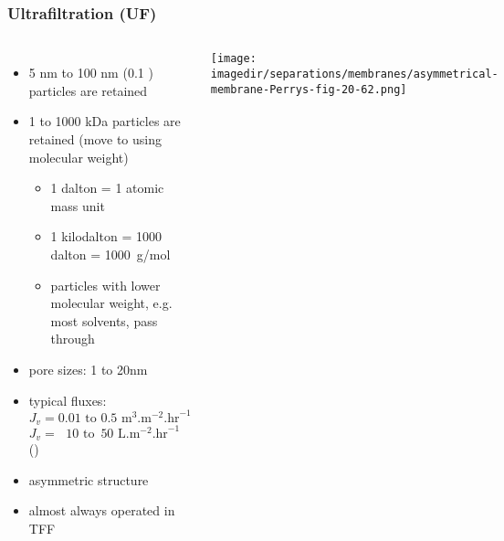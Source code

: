 \begin{frame}\frametitle{Ultrafiltration (UF)}	
	\begin{columns}[c]
			\vspace{-20pt}
			\begin{itemize}
				\item	5 nm to 100 nm (0.1 \micron) particles are retained
				\item	1 to 1000 kDa particles are retained (move to using molecular weight)
				\begin{itemize}
					\item	1 dalton = 1 atomic mass unit
					\item	1 kilodalton = 1000 dalton = 1000~g/mol
					\item	particles with lower molecular weight, e.g. most solvents, pass through
				\end{itemize}
				\item	pore sizes: 1 to 20nm
				\item	typical fluxes: $J_v = 0.01 \text{~to~} 0.5 \text{~m}^3\text{.m}^{-2}.\text{hr}^{-1}$\\$J_v = ~~\,10 \text{~to~} \,50 \text{~L}\text{.m}^{-2}.\text{hr}^{-1}$ ({\color{purple}{LMH}})
				\item	asymmetric structure
				\item	almost always operated in TFF
			\end{itemize}
			\begin{center}
				\texttt{[image: \\imagedir/separations/membranes/asymmetrical-membrane-Perrys-fig-20-62.png]}
			\end{center}
			\vspace{-12pt}
	\end{columns}
\end{frame}

